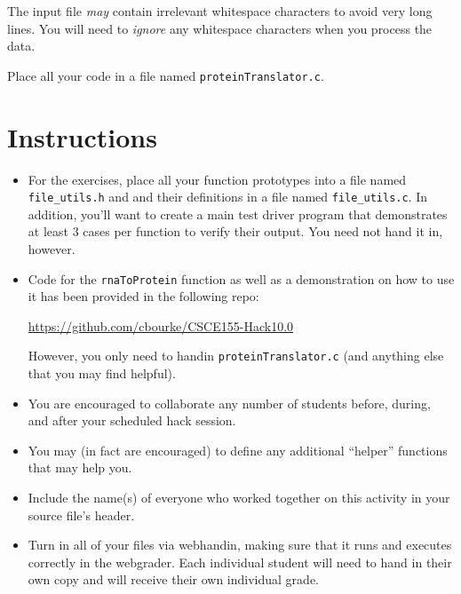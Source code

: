 \documentclass[12pt]{scrartcl}
\begin{document}
The input file \emph{may} contain irrelevant whitespace characters to
avoid very long lines.  You will need to \emph{ignore} any whitespace
characters when you process the data.  

Place all your code in a file named \texttt{proteinTranslator.c}.

\section*{Instructions}

\begin{itemize}

  \item For the exercises, place all your function prototypes into a file 
  named \texttt{file_utils.h} and and their definitions in a
  file named \texttt{file_utils.c}.  In addition, you'll want
  to create a main test driver program that demonstrates at least 3 cases 
  per function to verify their output.  You need not hand it in, however.
  
  \item Code for the \texttt{rnaToProtein} function as well as 
  a demonstration on how to use it has been provided in the following repo:

  \url{https://github.com/cbourke/CSCE155-Hack10.0}

  However, you only need to handin \texttt{proteinTranslator.c}
  (and anything else that you may find helpful).

  \item You are encouraged to collaborate any number of students 
  before, during, and after your scheduled hack session.  

  \item You may (in fact are encouraged) to define any additional
  ``helper'' functions that may help you.

  \item Include the name(s) of everyone who worked together on
  this activity in your source file's header.

  \item Turn in all of your files via webhandin, making sure that 
  it runs and executes correctly in the webgrader.  Each individual 
  student will need to hand in their own copy and will receive 
  their own individual grade.
\end{itemize}  
\end{document}
